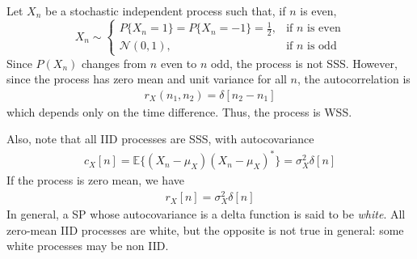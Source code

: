 \begin{example}
Let $X_n$ be a stochastic independent process such that, if $n$ is even, 
\begin{equation}
X_n \sim 
   \begin{cases} 
   P\{X_n=1\} = P\{X_n=-1\} = \frac12, & \text{if } n \text{ is even} \\ 
   \mathcal{N}(0,1),                   & \text{if } n \text{ is odd} 
   \end{cases}
\end{equation}
Since $P(X_n)$ changes from $n$ even to $n$ odd, the process is not SSS. However, since the process has zero mean and unit variance for all $n$, the autocorrelation is
\begin{align}
r_X(n_1, n_2) = \delta[n_2 - n_1]
\end{align}
which depends only on the time difference. Thus, the process is WSS.
\end{example}

Also, note that all IID processes are SSS, with autocovariance
\begin{align}
c_X[n] = \mathbb{E}\{(X_n-\mu_X)(X_n-\mu_X)^*\} = \sigma_X^2 \delta[n]
\end{align}
If the process is zero mean, we have
\begin{align}
\label{eq:rxwhiteprocess}
r_X[n] = \sigma_X^2 \delta[n]
\end{align}
In general, a SP whose autocovariance is a delta function is said to be \emph{white}. All zero-mean IID processes are white, but the opposite is not true in general: some white processes may be non IID.

